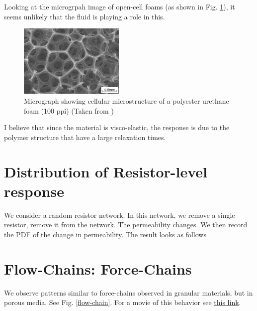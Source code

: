 Looking at the microgrpah image of open-cell foams (as shown in Fig. \ref{micrograph}), it seems unlikely that the fluid is playing a role in this. 
%
\begin{figure}[H]
  \centering
  \includegraphics[width=0.45\textwidth]{./Figs/micrograph-open-cell.png}
  \caption{Micrograph showing cellular microstructure of a polyester urethane foam (100 ppi) (Taken from \cite{gong2005compressive}) } \label{micrograph}
\end{figure}
%
I believe that since the material is visco-elastic, the response is due to the polymer structure that have a large relaxation times. 








\section{Distribution of Resistor-level response}
%
We consider a random resistor network. In this network, we remove a single resistor, remove it from the network. The permeability changes. We then record the PDF of the change in permeability. 
The result looks as follows
%



\section{Flow-Chains: Force-Chains}
%
We observe patterns similar to force-chains observed in granular
materials, but in porous media. See Fig. \ref{flow-chain}. For a movie
of this behavior see
\href{https://www.youtube.com/watch?v=E8sVcxipNio}{this link}.

